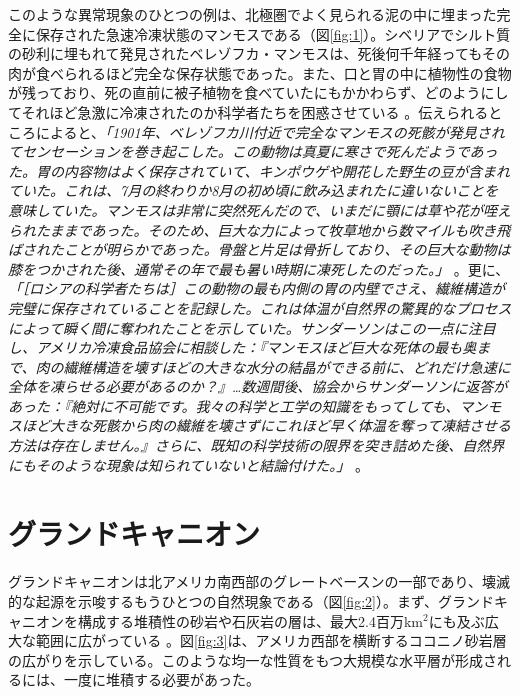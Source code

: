 \documentclass[10pt,twocolumn,letterpaper]{article}
\begin{document}
このような異常現象のひとつの例は、北極圏でよく見られる泥の中に埋まった完全に保存された急速冷凍状態のマンモスである（図\ref{fig:1}）。シベリアでシルト質の砂利に埋もれて発見されたベレゾフカ・マンモスは、死後何千年経ってもその肉が食べられるほど完全な保存状態であった。また、口と胃の中に植物性の食物が残っており、死の直前に被子植物を食べていたにもかかわらず、どのようにしてそれほど急激に冷凍されたのか科学者たちを困惑させている \cite{17}。伝えられるところによると、\textit{「1901年、ベレゾフカ川付近で完全なマンモスの死骸が発見されてセンセーションを巻き起こした。この動物は真夏に寒さで死んだようであった。胃の内容物はよく保存されていて、キンポウゲや開花した野生の豆が含まれていた。これは、7月の終わりか8月の初め頃に飲み込まれたに違いないことを意味していた。マンモスは非常に突然死んだので、いまだに顎には草や花が咥えられたままであった。そのため、巨大な力によって牧草地から数マイルも吹き飛ばされたことが明らかであった。骨盤と片足は骨折しており、その巨大な動物は膝をつかされた後、通常その年で最も暑い時期に凍死したのだった。」} \cite{18}。更に、\textit{「［ロシアの科学者たちは］この動物の最も内側の胃の内壁でさえ、繊維構造が完璧に保存されていることを記録した。これは体温が自然界の驚異的なプロセスによって瞬く間に奪われたことを示していた。サンダーソンはこの一点に注目し、アメリカ冷凍食品協会に相談した：『マンモスほど巨大な死体の最も奥まで、肉の繊維構造を壊すほどの大きな水分の結晶ができる前に、どれだけ急速に全体を凍らせる必要があるのか？』…数週間後、協会からサンダーソンに返答があった：『絶対に不可能です。我々の科学と工学の知識をもってしても、マンモスほど大きな死骸から肉の繊維を壊さずにこれほど早く体温を奪って凍結させる方法は存在しません。』さらに、既知の科学技術の限界を突き詰めた後、自然界にもそのような現象は知られていないと結論付けた。」} \cite{19}。

\section{グランドキャニオン}

グランドキャニオンは北アメリカ南西部のグレートベースンの一部であり、壊滅的な起源を示唆するもうひとつの自然現象である（図\ref{fig:2}）。まず、グランドキャニオンを構成する堆積性の砂岩や石灰岩の層は、最大2.4百万km$^2$にも及ぶ広大な範囲に広がっている \cite{21}。図\ref{fig:3}は、アメリカ西部を横断するココニノ砂岩層の広がりを示している。このような均一な性質をもつ大規模な水平層が形成されるには、一度に堆積する必要があった。
\end{document}
